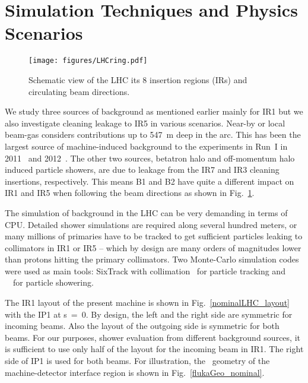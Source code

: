 \section{Simulation Techniques and Physics Scenarios\label{simSetup}}


\begin{figure}%
\begin{center}
\texttt{[image: figures/LHCring.pdf]}
\end{center}
\vspace{-0.6cm}
 \caption{Schematic view of the LHC its 8 insertion regions (IRs) and circulating beam directions.
  \label{LHCring}}
\end{figure}

We study three sources of background as mentioned earlier mainly for IR1 but we also investigate cleaning leakage to IR5 in various scenarios. Near-by or local beam-gas considers contributions up to 547~m deep in the arc. This has been the largest source of machine-induced background to the experiments in Run~I in 2011~\cite{nimPaperRod} and 2012~\cite{atlasBKGPaper2012}. The other two sources, betatron halo and off-momentum halo induced particle showers, are due to leakage from the IR7 and IR3 cleaning insertions, respectively. This means B1 and B2 have quite a different impact on IR1 and IR5 when following the beam directions as shown in Fig.~\ref{LHCring}.

The simulation of background in the LHC can be very demanding in terms of CPU. Detailed shower simulations are required along several hundred meters, or many millions of primaries have to be tracked to get sufficient particles leaking to collimators in IR1 or IR5 -- which by design are many orders of magnitudes lower than protons hitting the primary collimators. Two Monte-Carlo simulation codes were used as main tools: SixTrack with collimation~\cite{SixTrackRef} for particle tracking and \fluka~\cite{flukaRef1,flukaRef2}~for particle showering.

The IR1 layout of the present machine is shown in Fig.~\ref{nominalLHC_layout} with the IP1 at s~=~0. By design, the left and the right side are symmetric for incoming beams. Also the layout of the outgoing side is symmetric for both beams. For our purposes, shower evaluation from different background sources, it is sufficient to use only half of the layout for the incoming beam in IR1. The right side of IP1 is used for both beams. For illustration, the \fluka~geometry of the machine-detector interface region is shown in Fig.~\ref{flukaGeo_nominal}.



